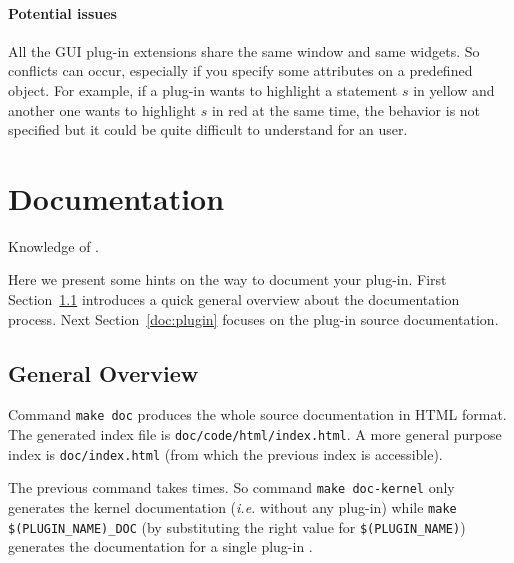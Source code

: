 \begin{important}
\paragraph{Potential issues}
All the GUI plug-in extensions share the same window and same
widgets. So conflicts can occur, especially if you
specify some attributes on a predefined object. For example, if a plug-in wants
to highlight a statement $s$ in yellow and another one
wants to highlight $s$ in red at the same time, the behavior is not specified
but it could be quite difficult to understand for an user.
\end{important}


\section{Documentation}\label{adv:documentation}

\begin{prereq}
  Knowledge of \ocamldoc.
\end{prereq}

Here we present some hints on the way to document your plug-in. First
Section~\ref{doc:rules} introduces a quick general overview about the
documentation process. Next Section~\ref{doc:plugin} focuses on the
plug-in source documentation.

\subsection{General Overview}\label{doc:rules}

Command \texttt{make doc} produces the whole \framac source
documentation in HTML format. The generated index
file is \texttt{doc/code/html/index.html}. A more general purpose index is
\texttt{doc/index.html} (from which the previous index is
accessible).

The previous command takes times. So command \texttt{make doc-kernel} only
generates the kernel documentation (\emph{i.e.}
\framac without any plug-in) while \texttt{make \$(PLUGIN\_NAME)\_DOC} (by
substituting the right value for
\texttt{\$(PLUGIN\_NAME)}) generates
the documentation for a single plug-in%
.

